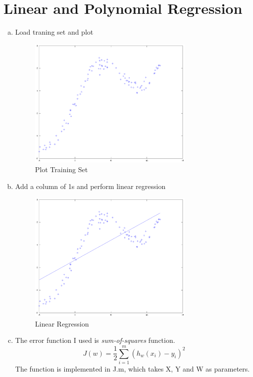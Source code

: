 \documentclass[a4paper, 12pt, titlepage]{article}
\begin{document}
\section{Linear and Polynomial Regression}
\begin{enumerate}[(a)]
        \item Load traning set and plot 
            \begin{figure}[H]
                \centering
                \includegraphics[width=8cm]{fig/a.eps}
                \caption{Plot Training Set}\label{a}
            \end{figure}
        
        \item Add a column of 1s and perform linear regression
            \begin{figure}[H]
                \centering
                \includegraphics[width=8cm]{fig/b.eps}
                \caption{Linear Regression}\label{b}
            \end{figure}

        \item The error function I used is \emph{sum-of-squares} function.
            $$J(w)=\frac{1}{2}\sum^m_{i=1}(h_w(x_i)-y_i)^2$$
            The function is implemented in J.m, which takes X, Y and W as parameters.


\end{enumerate}
\end{document}
